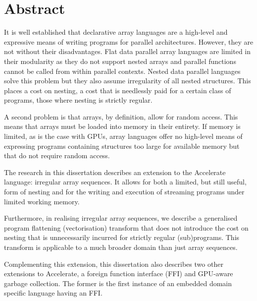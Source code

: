 \chapter{Abstract}

It is well established that declarative array languages are a high-level and expressive means of writing programs for parallel architectures. However, they are not without their disadvantages. Flat data parallel array languages are limited in their modularity as they do not support nested arrays and parallel functions cannot be called from within parallel contexts. Nested data parallel languages solve this problem but they also assume irregularity of all nested structures. This places a cost on nesting, a cost that is needlessly paid for a certain class of programs, those where nesting is strictly regular.

A second problem is that arrays, by definition, allow for random access. This means that arrays must be loaded into memory in their entirety. If memory is limited, as is the case with GPUs, array languages offer no high-level means of expressing programs containing structures too large for available memory but that do not require random access.

The research in this dissertation describes an extension to the Accelerate language: irregular array sequences. It allows for both a limited, but still useful, form of nesting and for the writing and execution of streaming programs under limited working memory.

Furthermore, in realising irregular array sequences, we describe a generalised program flattening (vectorisation) transform that does not introduce the cost on nesting that is unnecessarily incurred for strictly regular (sub)programs. This transform is applicable to a much broader domain than just array sequences.

Complementing this extension, this dissertation also describes two other extensions to Accelerate, a foreign function interface (FFI) and GPU-aware garbage collection. The former is the first instance of an embedded domain specific language having an FFI.

